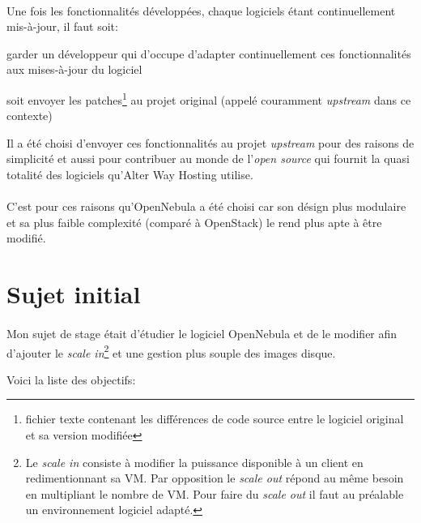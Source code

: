 \paragraph*{}
Une fois les fonctionnalités développées, chaque logiciels étant continuellement mis-à-jour, il faut soit:
\begin{listi}
	\item garder un développeur qui d'occupe d'adapter continuellement ces fonctionnalités aux mises-à-jour du logiciel
	\item soit envoyer les patches\footnote{fichier texte contenant les différences de code source entre le logiciel original et sa version modifiée}
		au projet original (appelé couramment \emph{upstream} dans ce contexte)
\end{listi}

Il a été choisi d'envoyer ces fonctionnalités au projet \emph{upstream} pour des raisons de simplicité et aussi pour contribuer au monde de
l'\emph{open source} qui fournit la quasi totalité des logiciels qu'Alter Way Hosting utilise.

\paragraph*{}
C'est pour ces raisons qu'OpenNebula a été choisi car son désign plus modulaire et sa plus faible complexité (comparé à OpenStack) le rend
plus apte à être modifié.

\section{Sujet initial}
\paragraph*{}
Mon sujet de stage était d'étudier le logiciel OpenNebula et de le modifier afin d'ajouter le \emph{scale in}\footnote{Le \emph{scale in} consiste à
modifier la puissance disponible à un client en redimentionnant sa VM. Par opposition le \emph{scale out} répond au même besoin en multipliant le nombre de VM.
Pour faire du \emph{scale out} il faut au préalable un environnement logiciel adapté.} et une gestion plus souple des images disque.

Voici la liste des objectifs:

